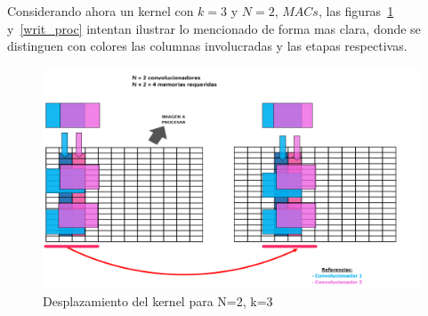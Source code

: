 Considerando ahora un kernel con $k=3$ y  $N=2$, $MACs$, las
figuras~\ref{writingprocess2} y~\ref{writ_proc} intentan ilustrar lo mencionado
de forma mas clara, donde se distinguen con colores las columnas involucradas y
las etapas respectivas.

\begin{figure}
\centering
\includegraphics[scale=0.75]{conv2_despl.png}
\caption{Desplazamiento del kernel para N=2, k=3 }
\label{writingprocess2}
\end{figure}




